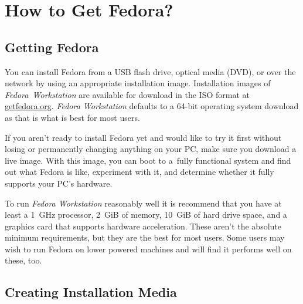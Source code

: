\chapter*{How to Get Fedora?}
\section*{Getting Fedora}

You can install Fedora from a USB flash drive, optical media (DVD), or over the network by using an appropriate installation image. Installation images of \emph{Fedora~Workstation} are available for download in the ISO format at \url{getfedora.org}. \emph{Fedora Workstation} defaults to a 64-bit operating system download as that is what is best for most users.

If you aren't ready to install Fedora yet and would like to try it first without losing or permanently changing anything on your PC, make sure you download a live image. With this image, you can boot to a~fully functional system and find out what Fedora is like, experiment with it, and determine whether it fully supports your PC's hardware.

To run \emph{Fedora Workstation} reasonably well it is recommend that you have at least a 1~GHz processor, 2~GiB of memory, 10~GiB of hard drive space, and a graphics card that supports hardware acceleration. These aren't the absolute minimum requirements, but they are the best for most users. Some users may wish to run Fedora on lower powered machines and will find it performs well on these, too.

\section*{Creating Installation Media}

